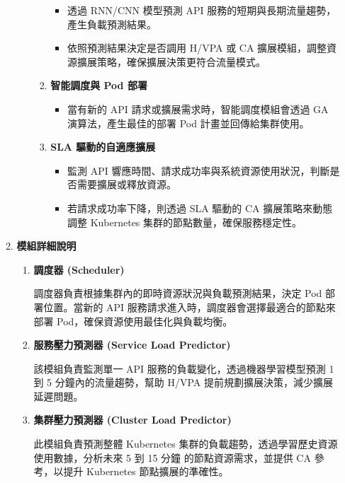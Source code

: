 \documentclass[12pt,a4paper]{article}
\begin{document}
\begin{enumerate}[label={(\zhdig*)}, leftmargin=2\parindent, listparindent=\parindent]
\begin{enumerate}[label={(\arabic*)}, leftmargin=\parindent, listparindent=\parindent]
\begin{enumerate}[label={(\zhdig*)}, leftmargin=\parindent, listparindent=\parindent]
\begin{enumerate}[label={(\arabic*)}, leftmargin=\parindent, listparindent=\parindent]
\begin{itemize}[leftmargin=\parindent, listparindent=\parindent]
    \item 透過 RNN/CNN 模型預測 API 服務的短期與長期流量趨勢，產生負載預測結果。
    \item 依照預測結果決定是否調用 H/VPA 或 CA 擴展模組，調整資源擴展策略，確保擴展決策更符合流量模式。
\end{itemize}
    \item\textbf{
智能調度與 Pod 部署}
\begin{itemize}[leftmargin=\parindent, listparindent=\parindent]
    \item 當有新的 API 請求或擴展需求時，智能調度模組會透過 GA 演算法，產生最佳的部署 Pod 計畫並回傳給集群使用。
\end{itemize}
\item\textbf{SLA 驅動的自適應擴展}
\begin{itemize}[leftmargin=\parindent, listparindent=\parindent]
    \item 監測 API 響應時間、請求成功率與系統資源使用狀況，判斷是否需要擴展或釋放資源。
    \item 若請求成功率下降，則透過 SLA 驅動的 CA 擴展策略來動態調整 Kubernetes 集群的節點數量，確保服務穩定性。
\end{itemize}


\end{enumerate}

\end{enumerate}


\item \textbf{
模組詳細說明}
\begin{enumerate}[label={(\zhdig*)}, leftmargin=\parindent, listparindent=\parindent]

    \item \textbf{
調度器 (Scheduler) }

調度器負責根據集群內的即時資源狀況與負載預測結果，決定 Pod 部署位置。當新的 API 服務請求進入時，調度器會選擇最適合的節點來部署 Pod，確保資源使用最佳化與負載均衡。

    \item \textbf{服務壓力預測器 (Service Load Predictor)}

該模組負責監測單一 API 服務的負載變化，透過機器學習模型預測 1 到 5 分鐘內的流量趨勢，幫助 H/VPA 提前規劃擴展決策，減少擴展延遲問題。

\item \textbf{集群壓力預測器 (Cluster Load Predictor) }

此模組負責預測整體 Kubernetes 集群的負載趨勢，透過學習歷史資源使用數據，分析未來 5 到 15 分鐘 的節點資源需求，並提供 CA 參考，以提升 Kubernetes 節點擴展的準確性。


\end{enumerate}
\end{enumerate}
\end{enumerate}
\end{document}
